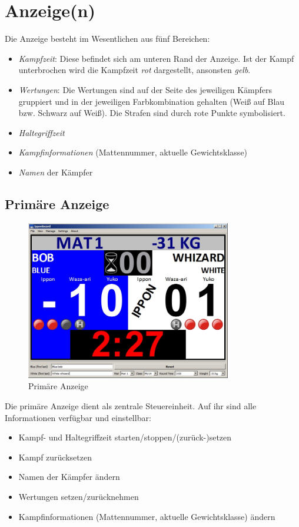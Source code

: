 ﻿\documentclass[11pt,numbers=noenddot]{scrreprt}
\begin{document}
\section{Anzeige(n)}
Die Anzeige besteht im Wesentlichen aus fünf Bereichen:
\begin{itemize}
	\item \textit{Kampfzeit}: Diese befindet sich am unteren Rand der Anzeige. Ist der Kampf unterbrochen wird die Kampfzeit \textit{rot} dargestellt, ansonsten \textit{gelb}.
	\item \textit{Wertungen}: Die Wertungen sind auf der Seite des jeweiligen Kämpfers gruppiert und in der jeweiligen Farbkombination gehalten (Weiß auf Blau bzw. Schwarz auf Weiß). Die Strafen sind durch rote Punkte symbolisiert.
	\item \textit{Haltegriffzeit}
	\item \textit{Kampfinformationen} (Mattennummer, aktuelle Gewichtsklasse)
	\item \textit{Namen} der Kämpfer
\end{itemize}

\subsection[Primäre Anzeige]{Primäre Anzeige}

\begin{figure}
	\centering
		\includegraphics[width=0.8\textwidth]{images/primary_view.jpg}
	\caption{Primäre Anzeige}
	\label{fig:Primary_View}
\end{figure}

Die primäre Anzeige dient als zentrale Steuereinheit. Auf ihr sind alle Informationen verfügbar und einstellbar:
\begin{itemize}
	\item Kampf- und Haltegriffzeit starten/stoppen/(zurück-)setzen
	\item Kampf zurücksetzen
	\item Namen der Kämpfer ändern
	\item Wertungen setzen/zurücknehmen
	\item Kampfinformationen (Mattennummer, aktuelle Gewichtsklasse) ändern
\end{itemize}
\end{document}
